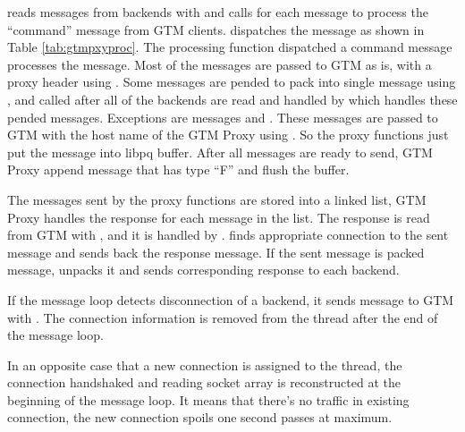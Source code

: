    reads messages from backends with  and calls
   for each message to process the ``command'' message from GTM clients.
   dispatches the message as shown in Table \ref{tab:gtmpxyproc}.
  The processing function dispatched a command message processes the message.
  Most of the messages are passed to GTM as is, with a proxy header using
  .
  Some messages are pended to pack into single message using ,
  and  called after all of the backends are read and
  handled by  which handles these pended messages.
  Exceptions are messages  and .
  These messages are passed to GTM with the host name of the GTM Proxy using
  .
  So the proxy functions just put the message into libpq buffer.
  After all messages are ready to send, GTM Proxy append  message that
  has type ``F'' and flush the buffer.
  
  The messages sent by the proxy functions are stored into a linked list, GTM Proxy handles
  the response for each message in the list.
  The response is read from GTM with , and it is handled by
  .
   finds appropriate connection to the sent message and sends back the
  response message.
  If the sent message is packed message, unpacks it and sends corresponding response to
  each backend.
  
  If the message loop detects disconnection of a backend, it sends 
  message to GTM with .
  The connection information is removed from the thread after the end of the message loop.
  
  In an opposite case that a new connection is assigned to the thread, the connection handshaked and
  reading socket array is reconstructed at the beginning of the message loop.
  It means that there's no traffic in existing connection, the new connection spoils one
  second passes at maximum.
  
